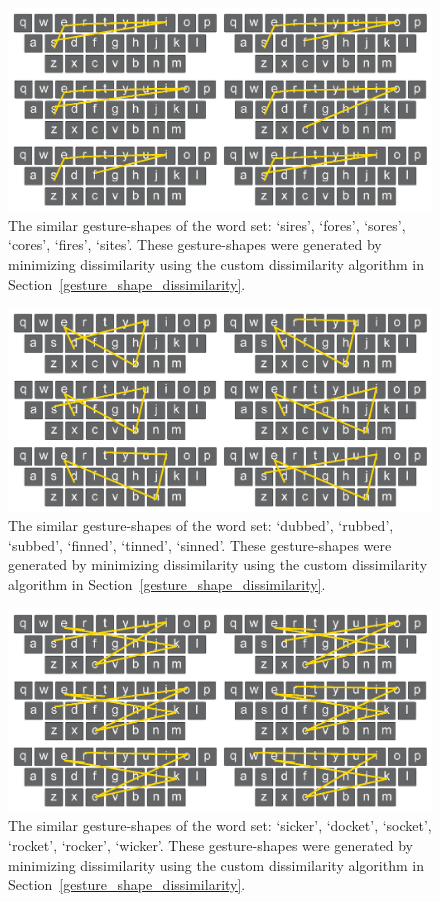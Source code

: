 \begin{figure}[b]
	\centering
	\includegraphics[width=5in]{Figures/fig_words_11}
	\caption[Word Set 11]{The similar gesture-shapes of the word set: `sires', `fores', `sores', `cores', `fires', `sites'. These gesture-shapes were generated by minimizing dissimilarity using the custom dissimilarity algorithm in Section~\ref{gesture_shape_dissimilarity}.}
	\label{fig_words_11}
\end{figure}

\clearpage

\begin{figure}[t]
	\centering
	\includegraphics[width=5in]{Figures/fig_words_12}
	\caption[Word Set 12]{The similar gesture-shapes of the word set: `dubbed', `rubbed', `subbed', `finned', `tinned', `sinned'. These gesture-shapes were generated by minimizing dissimilarity using the custom dissimilarity algorithm in Section~\ref{gesture_shape_dissimilarity}.}
	\label{fig_words_12}
\end{figure}

\begin{figure}[b]
	\centering
	\includegraphics[width=5in]{Figures/fig_words_13}
	\caption[Word Set 13]{The similar gesture-shapes of the word set: `sicker', `docket', `socket', `rocket', `rocker', `wicker'. These gesture-shapes were generated by minimizing dissimilarity using the custom dissimilarity algorithm in Section~\ref{gesture_shape_dissimilarity}.}
	\label{fig_words_13}
\end{figure}

